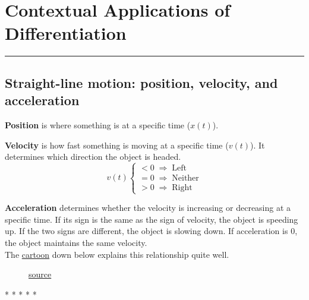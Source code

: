 \documentclass[12pt]{article}
\newcommand{\fline}{\par\noindent\rule{\textwidth}{0.1pt}} %
\begin{document}
\section[Contextual Applications of Differentiation]{Contextual Applications of Differentiation}
\fline

\subsection{Straight-line motion: position, velocity, and acceleration}
\noindent \textbf{Position} is where something is at a specific time ($x(t)$).

\noindent \textbf{Velocity} is how fast something is moving at a specific time ($v(t)$). It determines which direction the object is headed.
\[ v(t) \begin{cases}
        <0 \; \Rightarrow \; \text{Left}    \\
        =0 \; \Rightarrow \; \text{Neither} \\
        >0 \; \Rightarrow \; \text{Right}
    \end{cases} \]

\noindent \textbf{Acceleration} determines whether the velocity is increasing or decreasing at a specific time. If its sign is the same as the sign of velocity, the object is speeding up. If the two signs are different, the object is slowing down. If acceleration is $0$, the object maintains the same velocity.
\\ The \hyperref[fig:posveloaccel]{cartoon} down below explains this relationship quite well.

\begin{figure}[H]
    \begin{center}
        \caption{\href{https://www.khanacademy.org/science/physics/one-dimensional-motion/acceleration-tutorial/a/acceleration-article?modal=1}{source}}
        \label{fig:posveloaccel}
    \end{center}
\end{figure}

\begin{center}
    * * * * *
\end{center}
\end{document}
